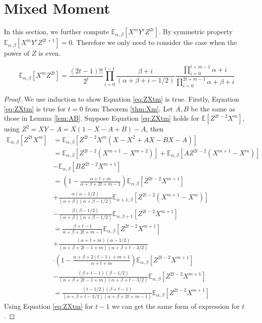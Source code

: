 \documentclass[mathpazo]{cmr}
\def\E{\mathbb{E}}
\begin{document}
\section{Mixed Moment}
In this section, we further compute $\E_{\alpha,\beta}[X^mY^rZ^{2t}]$.
By symmetric property  $\E_{\alpha,\beta}[X^mY^rZ^{2t+1}] = 0$.
Therefore we only need to consider the case when the power of $Z$
is even.
\begin{theorem}\label{thm:mm}
	\begin{equation}\label{eq:ZXtm}
	\E_{\alpha, \beta}[X^mZ^{2t}] = \frac{(2t-1)!!}{2^t}
	\prod_{i=0}^{t-1}
	\frac{\beta+i}{(\alpha+\beta+i-1/2)}
	\frac{\prod_{i=0}^{t+m-1}\alpha+i}{\prod_{i=0}^{2t+m-1}
		\alpha+\beta+i}
	\end{equation}
\end{theorem}
\begin{proof}
	We use induction to show Equation \eqref{eq:ZXtm} is true.
	Firstly, Equation \eqref{eq:ZXtm} is true for $t=0$ from 
	Theorem \ref{thm:Xm}. Let $A, B$ be the same as those
	in Lemma \ref{lem:AB}.
	Suppose Equation \eqref{eq:ZXtm} holds for $\E[Z^{2t-2}X^m]$,
	using $Z^2=XY-A=X(1-X-A+B)-A$, then
	\begin{align*}
	\E_{\alpha,\beta}[Z^{2t}X^m] &=
	\E_{\alpha,\beta}[Z^{2t-2}X^m(X-X^2+AX-BX-A)] \\
	&= \E_{\alpha,\beta}[Z^{2t-2}(X^{m+1} - X^{m+2})] +
	\E_{\alpha,\beta}[A Z^{2t-2} (X^{m+1} - X^m)] \\
	&-
	\E_{\alpha,\beta}[BZ^{2t-2} X^{m+1}] \\
	&= \left(1-\frac{\alpha+t+m}{\alpha+\beta+2t+m-1}
	\right)\E_{\alpha, \beta}[Z^{2t-2}X^{m+1}] \\
	&+
	\frac{\alpha(\alpha-1/2)}{(\alpha+\beta)(\alpha+\beta-1/2)}
	\E_{\alpha+1,\beta}[Z^{2t-2}(X^{m+1} - X^m)] \\
	&-\frac{\beta(\beta-1/2)}{(\alpha+\beta)(\alpha+\beta-1/2)}
	\E_{\alpha,\beta+1}[Z^{2t-2}X^{m+1}]\\
	&=\frac{\beta+t-1}{\alpha+\beta + 2t+m-1}
	\E_{\alpha,\beta}[Z^{2t-2}X^{m+1}] \\
	&+\frac{(\alpha+t+m)(\alpha-1/2)}{(\alpha+\beta+2t-1+m)(\alpha+\beta + t - 3/2)}\\
	&\cdot
	\left(1-\frac{\alpha+\beta+2(t-1)+m+1}{\alpha+t+m}\right)
	\E_{\alpha, \beta}[Z^{2t-2}X^{m+1}] \\
	&-\frac{(\beta+t-1)(\beta-1/2)}{(\alpha+\beta+2t-1+m)(\alpha+\beta + t - 3/2)}
	\E_{\alpha,\beta}[Z^{2t-2}X^{m+1}]\\
	&=\frac{(t-1/2)(\beta+t-1)}{(\alpha+\beta+t-3/2)(\alpha+\beta+2t+m-1)}
	\E_{\alpha, \beta}[Z^{2t-2}X^{m+1}]
	\end{align*}
	Using Equation \eqref{eq:ZXtm} for $t-1$
	we can get the same form of expression for $t$.
\end{proof}
\end{document}
